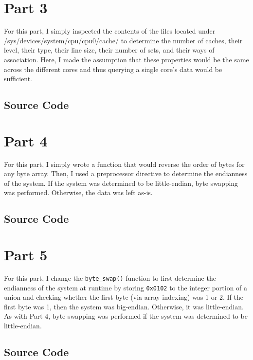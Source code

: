 \documentclass[12pt]{article}
\begin{document}
\section*{Part 3}
For this part, I simply inspected the contents of the files located under /sys/devices/system/cpu/cpu0/cache/ to determine the number of caches, their level, their type, their line size, their number of sets, and their ways of association. Here, I made the assumption that these properties would be the same across the different cores and thus querying a single core's data would be sufficient. 
\subsection*{Source Code}

\section*{Part 4}
For this part, I simply wrote a function that would reverse the order of bytes for any byte array. Then, I used a preprocessor directive to determine the endianness of the system. If the system was determined to be little-endian, byte swapping was performed. Otherwise, the data was left as-is.
\subsection*{Source Code}

\section*{Part 5}
For this part, I change the \verb!byte_swap()! function to first determine the endianness of the system at runtime by storing \verb!0x0102! to the integer portion of a union and checking whether the first byte (via array indexing) was 1 or 2. If the first byte was 1, then the system was big-endian. Otherwise, it was little-endian. As with Part 4, byte swapping was performed if the system was determined to be little-endian.
\subsection*{Source Code}

\end{document}
